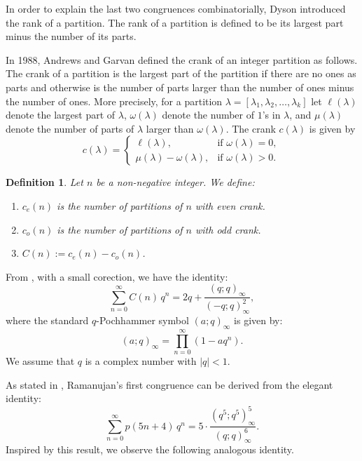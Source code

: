 \documentclass{article}
\newtheorem{definition}{Definition}
\begin{document}
In order to explain the last two congruences combinatorially, Dyson \cite{Dyson}
introduced the rank of a partition. The rank of a partition is defined to be its
largest part minus the number of its parts.

In 1988, Andrews and Garvan \cite{Andrews88} defined the crank of an integer partition as follows. 
The crank of a partition is the largest part of the partition if there are no ones as parts and otherwise is the number of parts larger than the number of ones minus the number of ones. More precisely,
for a partition $\lambda=[\lambda_1,\lambda_2,\ldots,\lambda_k]$
let $\ell(\lambda)$ denote the largest part of $\lambda$, 
$\omega(\lambda)$ denote the number of $1$'s in $\lambda$, and $\mu(\lambda)$ denote the number of parts of $\lambda$ larger than $\omega(\lambda)$. The crank $c(\lambda)$ is given by
$$
c(\lambda) = \begin{cases}
\ell(\lambda), & \text{if $\omega(\lambda)=0,$}\\
\mu(\lambda)-\omega(\lambda),& \text{if $\omega(\lambda)>0.$}
\end{cases}
$$

	\begin{definition}
		Let $n$ be a non-negative integer. We define:
		\begin{enumerate}
			\item  $c_e(n)$ is the number of partitions of $n$ with even crank.
			\item  $c_o(n)$ is the number of partitions of $n$ with odd crank.
			\item  $C(n):=c_e(n)-c_o(n)$. 
		\end{enumerate}
	\end{definition}


\medskip
From \cite{Andrews18}, with a small corection, we have the identity:
$$
\sum_{n=0}^\infty C(n)\, q^n = %
2q+\frac{(q;q)_\infty}{(-q;q)_\infty^2},
$$
where 
the standard $q$-Pochhammer symbol $(a; q)_\infty$ is given by:
$$
(a; q)_\infty = \prod_{n=0}^\infty (1 - a q^n).
$$
We assume that $q$ is a complex number with $|q| < 1$.

As stated in \cite[Theorem 2.3.4]{Berndt}, Ramanujan's first congruence can be derived from the elegant identity:
$$
\sum_{n=0}^\infty p(5n + 4)\, q^n = %
5\cdot \frac{(q^5;q^5)^5_\infty}{(q;q)^6_\infty}.
$$
Inspired by this result, we observe the following analogous identity.
\end{document}
